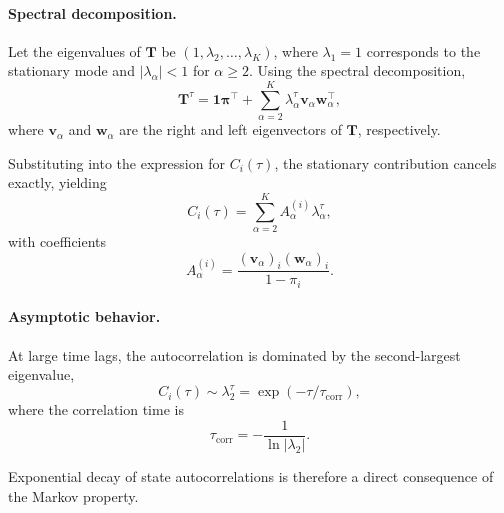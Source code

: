 \documentclass[
    aps,
    prl,
    reprint,
    superscriptaddress,
    amsmath,amssymb,
    nofootinbib,
    floatfix
]{revtex4-2}
\begin{document}
\paragraph{Spectral decomposition.}
Let the eigenvalues of $\mathbf{T}$ be $(1,\lambda_2,\dots,\lambda_K)$, where
$\lambda_1=1$ corresponds to the stationary mode and
$|\lambda_\alpha|<1$ for $\alpha\ge2$.
Using the spectral decomposition,
\begin{equation}
    \mathbf{T}^\tau
    =
    \mathbf{1}\boldsymbol{\pi}^\top
    + \sum_{\alpha=2}^K \lambda_\alpha^\tau
    \mathbf{v}_\alpha \mathbf{w}_\alpha^\top,
\end{equation}
where $\mathbf{v}_\alpha$ and $\mathbf{w}_\alpha$ are the right and left
eigenvectors of $\mathbf{T}$, respectively.

Substituting into the expression for $C_i(\tau)$, the stationary contribution
cancels exactly, yielding
\begin{equation}
    C_i(\tau)
    =
    \sum_{\alpha=2}^K
    A_\alpha^{(i)} \lambda_\alpha^\tau,
\end{equation}
with coefficients
\begin{equation}
    A_\alpha^{(i)}
    =
    \frac{
        (\mathbf{v}_\alpha)_i (\mathbf{w}_\alpha)_i
    }{
        1-\pi_i
    }.
\end{equation}

\paragraph{Asymptotic behavior.}
At large time lags, the autocorrelation is dominated by the second-largest
eigenvalue,
\begin{equation}
    C_i(\tau) \sim \lambda_2^\tau
    =
    \exp\!\left(-\tau / \tau_{\mathrm{corr}}\right),
\end{equation}
where the correlation time is
\begin{equation}
    \tau_{\mathrm{corr}} = -\frac{1}{\ln|\lambda_2|}.
\end{equation}

Exponential decay of state autocorrelations is therefore a direct consequence
of the Markov property.




\end{document}
